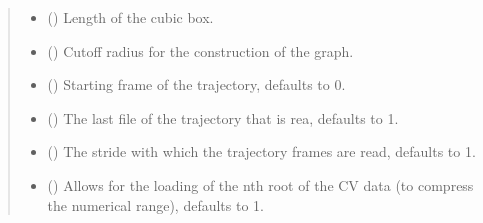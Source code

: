 \documentclass[a4paper,10pt,english]{report}
\begin{document}
\begin{fulllineitems}
\begin{quote}
\begin{description}
\begin{itemize}
\item {} 
\sphinxAtStartPar
{} () \textendash{} Length of the cubic box.

\item {} 
\sphinxAtStartPar
{} () \textendash{} Cut\sphinxhyphen{}off radius for the construction of the graph.

\item {} 
\sphinxAtStartPar
{} (\sphinxstyleliteralemphasis{\sphinxupquote{, }}) \textendash{} Starting frame of the trajectory, defaults to 0.

\item {} 
\sphinxAtStartPar
{} (\sphinxstyleliteralemphasis{\sphinxupquote{, }}) \textendash{} The last file of the trajectory that is rea, defaults to \sphinxhyphen{}1.

\item {} 
\sphinxAtStartPar
{} (\sphinxstyleliteralemphasis{\sphinxupquote{, }}) \textendash{} The stride with which the trajectory frames are read, defaults to 1.

\item {} 
\sphinxAtStartPar
{} (\sphinxstyleliteralemphasis{\sphinxupquote{, }}) \textendash{} Allows for the loading of the n\sphinxhyphen{}th root of the CV data (to compress the numerical range), defaults to 1.

\end{itemize}

\end{description}\end{quote}

\end{fulllineitems}

\end{document}
